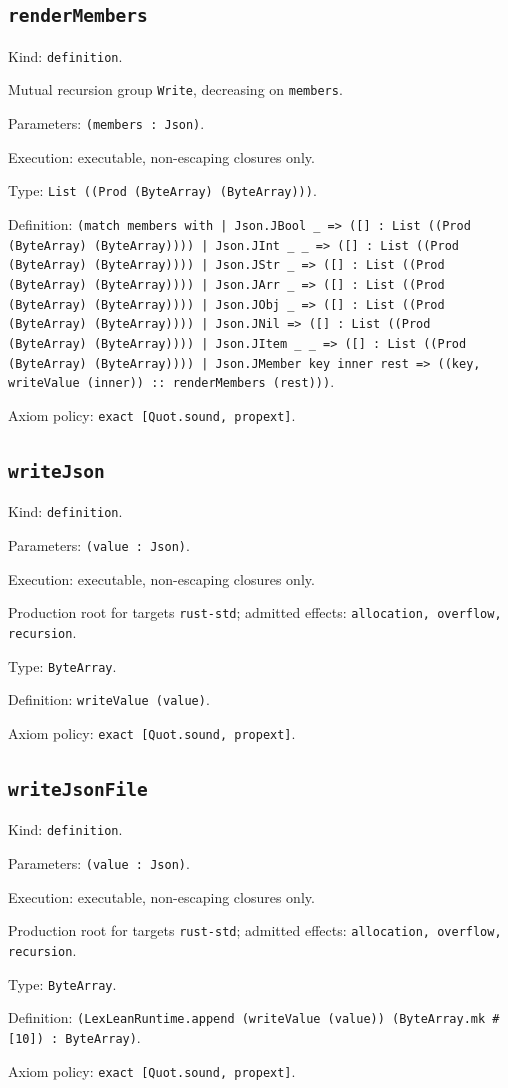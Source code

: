 \documentclass[11pt]{article}
\begin{document}
\subsection*{\texttt{renderMembers}}
\noindent Kind: \texttt{definition}.\par
\noindent Mutual recursion group \texttt{Write}, decreasing on \texttt{members}.\par
\noindent Parameters: \texttt{(members : Json)}.\par
\noindent Execution: executable, non-escaping closures only.\par
\noindent Type: \texttt{List ((Prod (ByteArray) (ByteArray)))}.\par
\noindent Definition: \texttt{(match members with | Json.JBool \_ => ([] : List ((Prod (ByteArray) (ByteArray)))) | Json.JInt \_ \_ => ([] : List ((Prod (ByteArray) (ByteArray)))) | Json.JStr \_ => ([] : List ((Prod (ByteArray) (ByteArray)))) | Json.JArr \_ => ([] : List ((Prod (ByteArray) (ByteArray)))) | Json.JObj \_ => ([] : List ((Prod (ByteArray) (ByteArray)))) | Json.JNil => ([] : List ((Prod (ByteArray) (ByteArray)))) | Json.JItem \_ \_ => ([] : List ((Prod (ByteArray) (ByteArray)))) | Json.JMember key inner rest => ((key, writeValue (inner)) :: renderMembers (rest)))}.\par
\noindent Axiom policy: \texttt{exact [Quot.sound, propext]}.\par
\subsection*{\texttt{writeJson}}
\noindent Kind: \texttt{definition}.\par
\noindent Parameters: \texttt{(value : Json)}.\par
\noindent Execution: executable, non-escaping closures only.\par
\noindent Production root for targets \texttt{rust-std}; admitted effects: \texttt{allocation, overflow, recursion}.\par
\noindent Type: \texttt{ByteArray}.\par
\noindent Definition: \texttt{writeValue (value)}.\par
\noindent Axiom policy: \texttt{exact [Quot.sound, propext]}.\par
\subsection*{\texttt{writeJsonFile}}
\noindent Kind: \texttt{definition}.\par
\noindent Parameters: \texttt{(value : Json)}.\par
\noindent Execution: executable, non-escaping closures only.\par
\noindent Production root for targets \texttt{rust-std}; admitted effects: \texttt{allocation, overflow, recursion}.\par
\noindent Type: \texttt{ByteArray}.\par
\noindent Definition: \texttt{(LexLeanRuntime.append (writeValue (value)) (ByteArray.mk \#[10]) : ByteArray)}.\par
\noindent Axiom policy: \texttt{exact [Quot.sound, propext]}.\par
\end{document}
